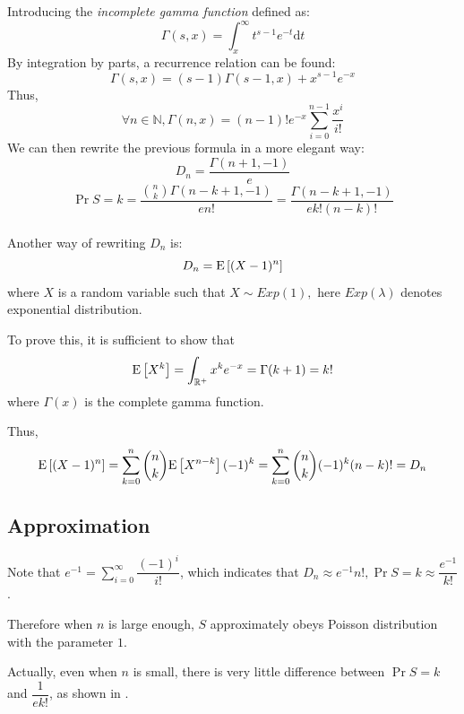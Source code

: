 Introducing the \emph{incomplete gamma function} defined as:
\[ \Gamma(s,x) = \int_{x}^{\infty}t^{s-1}e^{-t}\mathrm{d}t\]
By integration by parts, a recurrence relation can be found:
\[ \Gamma(s,x) = (s-1)\Gamma(s-1,x) + x^{s-1}e^{-x}\]
Thus,
\[\forall n\in \mathbb{N}, \Gamma(n,x) = (n-1)! e^{-x}\sum_{i=0}^{n-1}\dfrac{x^i}{i!}\]
We can then rewrite the previous formula in a more elegant way:
\[ D_n = \dfrac{\Gamma(n+1, -1)}{e}\]
\[ \Pr{S=k}=\dfrac{{n\choose{k}}\Gamma(n-k+1,-1)}{en!} =\dfrac{\Gamma(n-k+1,-1)}{ek!(n-k)!}\]
\\

Another way of rewriting $ D_n$ is:
\[ D_n = \text{E}\left[(X-1)^n\right]\]
where $ X$ is a random variable such that $ X\sim Exp(1),$
here  $Exp(\lambda) $ denotes exponential distribution.

To prove this, it is sufficient to show that
\[ \E{X^k} = \int_{\mathbb{R}^+}x^ke^{-x} = \Gamma(k+1) = k!\]
where $ \Gamma(x)$ is the complete gamma function.

Thus,
\[ \E{(X-1)^n} = \sum_{k=0}^n{n\choose{k}}\E{X^{n-k}}(-1)^k = \sum_{k=0}^n{n\choose k}(-1)^k(n-k)! = D_n\]

\subsection{Approximation}
Note that $ e^{-1} = \sum_{i=0}^{\infty}\dfrac{(-1)^i}{i!}$,
which indicates that $D_n \approx e^{-1}n!, \Pr{S=k}\approx \dfrac{e^{-1}}{k!}$.

Therefore when $ n$ is large enough,
$ S$ approximately obeys Poisson distribution with the parameter $ 1$.

Actually, even when $ n$ is small,
there is very little difference between $ \Pr{S=k}$ and $ \dfrac{1}{ek!}$,
as shown in .

